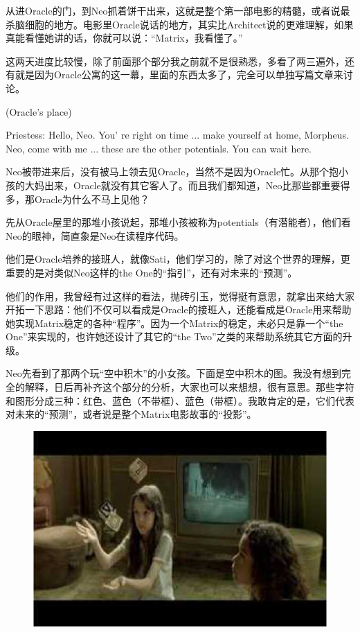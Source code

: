 \documentclass[UTF8]{ctexart}
\newenvironment{myquote}{\color{green} \setlength{\leftskip}{6em} \setlength{\rightskip}{4em} \setlength{\parindent}{-2em}}{\par}
\begin{document}
从进Oracle的门，到Neo抓着饼干出来，这就是整个第一部电影的精髓，或者说最杀脑细胞的地方。电影里Oracle说话的地方，其实比Architect说的更难理解，如果真能看懂她讲的话，你就可以说：“Matrix，我看懂了。”

这两天进度比较慢，除了前面那个部分我之前就不是很熟悉，多看了两三遍外，还有就是因为Oracle公寓的这一幕，里面的东西太多了，完全可以单独写篇文章来讨论。

\begin{myquote}
(Oracle's place)

Priestess: Hello, Neo. You' re right on time ... make yourself at home, Morpheus. Neo, come with me ... these are the other potentials. You can wait here.
\end{myquote}

Neo被带进来后，没有被马上领去见Oracle，当然不是因为Oracle忙。从那个抱小孩的大妈出来，Oracle就没有其它客人了。而且我们都知道，Neo比那些都重要得多，那Oracle为什么不马上见他？

先从Oracle屋里的那堆小孩说起，那堆小孩被称为potentials（有潜能者），他们看Neo的眼神，简直象是Neo在读程序代码。

他们是Oracle培养的接班人，就像Sati，他们学习的，除了对这个世界的理解，更重要的是对类似Neo这样的the One的“指引”，还有对未来的“预测”。

他们的作用，我曾经有过这样的看法，抛砖引玉，觉得挺有意思，就拿出来给大家开拓一下思路：他们不仅可以看成是Oracle的接班人，还能看成是Oracle用来帮助她实现Matrix稳定的各种“程序”。因为一个Matrix的稳定，未必只是靠一个“the One”来实现的，也许她还设计了其它的“the Two”之类的来帮助系统其它方面的升级。

Neo先看到了那两个玩“空中积木”的小女孩。下面是空中积木的图。我没有想到完全的解释，日后再补齐这个部分的分析，大家也可以来想想，很有意思。那些字符和图形分成三种：红色、蓝色（不带框）、蓝色（带框）。我敢肯定的是，它们代表对未来的“预测”，或者说是整个Matrix电影故事的“投影”。

\begin{figure}[htb]
\centering
\includegraphics[width=0.5\linewidth]{fig/read_Matrix-43}
\end{figure}
\end{document}
